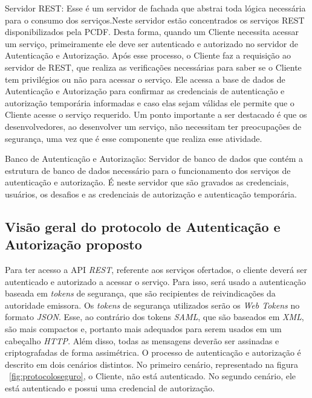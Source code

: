 Servidor REST: Esse é um servidor de fachada que abstrai toda lógica necessária para o consumo dos serviços.Neste servidor estão concentrados os serviços REST disponibilizados pela PCDF. Desta forma, quando um Cliente necessita acessar um serviço, primeiramente ele deve ser autenticado e autorizado no servidor de Autenticação e Autorização. Após esse processo, o Cliente faz a requisição ao servidor de REST, que realiza as verificações necessárias para saber se o Cliente tem privilégios ou não para acessar o serviço. Ele acessa a base de dados de Autenticação e Autorização para confirmar as credenciais de autenticação e autorização temporária informadas e caso elas sejam válidas ele permite que o Cliente acesse o serviço requerido. Um ponto importante a ser destacado é que os desenvolvedores, ao desenvolver um serviço, não necessitam ter preocupações de segurança, uma vez que é esse componente que realiza esse atividade.

Banco de Autenticação e Autorização: Servidor de banco de dados que contém a estrutura de banco de dados necessário  para o funcionamento dos serviços de autenticação e autorização. É neste servidor que são gravados as credenciais, usuários, os desafios e as credenciais de autorização e autenticação temporária.


\subsection{Visão geral do protocolo de Autenticação e Autorização proposto}

Para ter acesso a API \emph{REST}, referente aos serviços ofertados, o cliente deverá ser autenticado e autorizado a acessar o serviço. Para isso, será usado a autenticação baseada em \emph{tokens} de segurança, que são recipientes de reivindicações da autoridade emissora. Os \emph{tokens} de segurança utilizados serão os \emph{Web Tokens} no formato \emph{JSON}. Esse, ao contrário dos tokens \emph{SAML}, que são baseados em \emph{XML}, são mais compactos e, portanto mais adequados para serem usados em um cabeçalho \emph{HTTP}. Além disso, todas as mensagens deverão ser assinadas e criptografadas de forma assimétrica. O processo de autenticação e autorização é descrito em dois cenários distintos. No primeiro cenário, representado na figura ~\ref{fig:protocoloseguro}, o Cliente, não está autenticado. No segundo cenário, ele está autenticado e possui uma credencial de autorização. %

